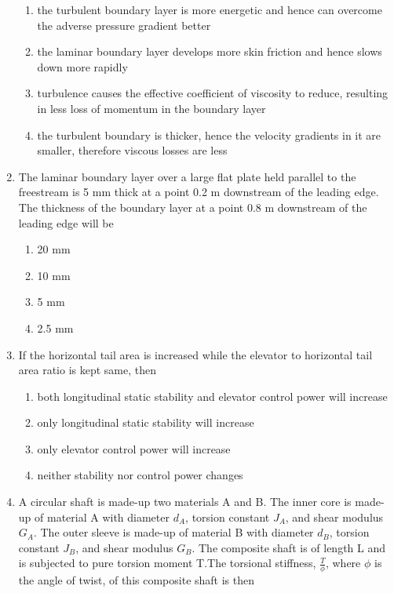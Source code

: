 \documentclass[journal]{IEEEtran}
\begin{document}
\begin{enumerate}[start=35]
    \begin{enumerate}
        \item the turbulent boundary layer is more energetic and hence can overcome the adverse pressure gradient better 
        \item the laminar boundary layer develops more skin friction and hence slows down more rapidly 
        \item turbulence causes the effective coefficient of viscosity to reduce, resulting in less loss of momentum in the boundary layer 
        \item the turbulent boundary is thicker, hence the velocity gradients in it are smaller, therefore viscous losses are less
    \end{enumerate}
\item The laminar boundary layer over a large flat plate held parallel to the freestream is 5 mm
    thick at a point 0.2 m downstream of the leading edge. The thickness of the boundary layer at a point 0.8 m downstream of the leading edge will be 
    \begin{multicols}{4}
        \begin{enumerate}
            \item 20 mm
            \item 10 mm
            \item 5 mm
            \item 2.5 mm
        \end{enumerate}
    \end{multicols}
\item If the horizontal tail area is increased while the elevator to horizontal tail area ratio is kept same, then 
    \begin{enumerate}
        \item both longitudinal static stability and elevator control power will increase 
        \item only longitudinal static stability will increase 
        \item only elevator control power will increase
        \item neither stability nor control power changes 
    \end{enumerate}
\item A circular shaft is made-up two materials A and B. The inner core is made-up of material A with diameter $d_A$, torsion constant $J_A$, and shear modulus $G_A$. The outer sleeve is made-up of material B with diameter $d_B$, torsion constant $J_B$, and shear modulus $G_B$. The composite shaft is of length L and is subjected to pure torsion moment T.The torsional stiffness, $\frac{T}{\phi}$, where $\phi$ is the angle of twist, of this composite shaft is then\\



\end{enumerate}
\end{document}
